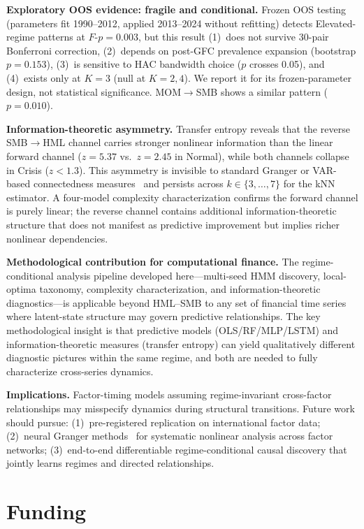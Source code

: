\documentclass[sigconf,anonymous]{acmart}
\begin{document}
\textbf{Exploratory OOS evidence: fragile and conditional.}
Frozen OOS testing (parameters fit 1990--2012, applied 2013--2024 without
refitting) detects Elevated-regime patterns at $F$-$p = 0.003$, but this
result (1)~does not survive 30-pair Bonferroni correction,
(2)~depends on post-GFC prevalence expansion (bootstrap $p = 0.153$),
(3)~is sensitive to HAC bandwidth choice ($p$ crosses 0.05),
and (4)~exists only at $K = 3$ (null at $K = 2, 4$).
We report it for its frozen-parameter design, not statistical significance.
MOM$\to$SMB shows a similar pattern ($p = 0.010$).

\textbf{Information-theoretic asymmetry.}
Transfer entropy reveals that the reverse SMB$\to$HML channel carries
stronger nonlinear information than the linear forward channel
($z = 5.37$ vs.\ $z = 2.45$ in Normal), while both channels collapse
in Crisis ($z < 1.3$). This asymmetry is invisible to standard
Granger or VAR-based connectedness measures~\cite{diebold2012better}
and persists across $k \in \{3,\ldots,7\}$ for the kNN estimator.
A four-model complexity characterization confirms the forward channel
is purely linear; the reverse channel contains additional
information-theoretic structure that does not manifest as predictive
improvement but implies richer nonlinear dependencies.

\textbf{Methodological contribution for computational finance.}
The regime-conditional analysis pipeline developed here---multi-seed
HMM discovery, local-optima taxonomy, complexity characterization,
and information-theoretic diagnostics---is applicable beyond
HML--SMB to any set of financial time series where latent-state
structure may govern predictive relationships. The key methodological
insight is that predictive models (OLS/RF/MLP/LSTM) and
information-theoretic measures (transfer entropy) can yield
qualitatively different diagnostic pictures within the same regime,
and both are needed to fully characterize cross-series dynamics.

\textbf{Implications.} Factor-timing models assuming regime-invariant cross-factor
relationships may misspecify dynamics during structural transitions.
Future work should pursue:
(1)~pre-registered replication on international factor data;
(2)~neural Granger methods~\cite{tank2022neural} for systematic
nonlinear analysis across factor networks;
(3)~end-to-end differentiable regime-conditional causal discovery
that jointly learns regimes and directed relationships.

\section*{Funding}
\end{document}
